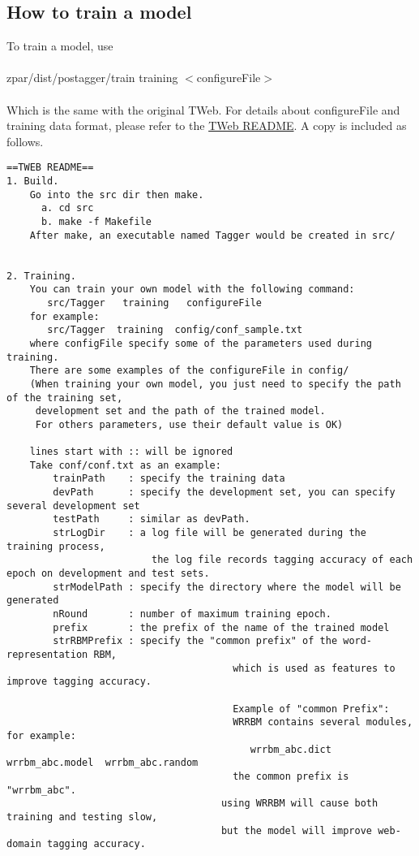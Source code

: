 \documentclass[12pt]{article}
\begin{document}
\begin{CJK}{GBK}{song}
\section{How to train a model}
\label{sec:how-train-model}
To train a model, use
\\
\\
\hspace{3cm} zpar/dist/postagger/train training $<$configureFile$>$ \\
\\
Which is the same with the original TWeb.
For details about configureFile and training data format, please refer to
the \href{https://raw.githubusercontent.com/majineu/TWeb/master/readme.txt}{TWeb README}.
A copy is included as follows.
\begin{verbatim}
==TWEB README==
1. Build.
	Go into the src dir then make.
	  a. cd src
	  b. make -f Makefile
	After make, an executable named Tagger would be created in src/


2. Training.
	You can train your own model with the following command:
	   src/Tagger   training   configureFile
	for example:
	   src/Tagger  training  config/conf_sample.txt	 
	where configFile specify some of the parameters used during training.
	There are some examples of the configureFile in config/
	(When training your own model, you just need to specify the path of the training set, 
	 development set and the path of the trained model.
	 For others parameters, use their default value is OK)

	lines start with :: will be ignored
	Take conf/conf.txt as an example:
		trainPath    : specify the training data
		devPath      : specify the development set, you can specify several development set
		testPath     : similar as devPath.
		strLogDir    : a log file will be generated during the training process,
		                 the log file records tagging accuracy of each epoch on development and test sets.
		strModelPath : specify the directory where the model will be generated
		nRound       : number of maximum training epoch.
		prefix       : the prefix of the name of the trained model
		strRBMPrefix : specify the "common prefix" of the word-representation RBM, 
									   which is used as features to improve tagging accuracy.
									 
									   Example of "common Prefix":
									   WRRBM contains several modules, for example:
										  wrrbm_abc.dict  wrrbm_abc.model  wrrbm_abc.random
									   the common prefix is "wrrbm_abc".
									 using WRRBM will cause both training and testing slow,
									 but the model will improve web-domain tagging accuracy.


\end{verbatim}
\end{CJK}
\end{document}
